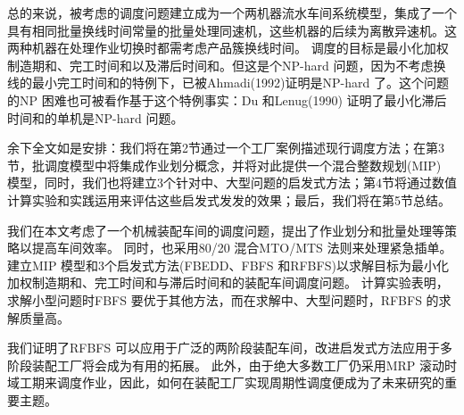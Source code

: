 总的来说，被考虑的调度问题建立成为一个两机器流水车间系统模型，集成了一个具有相同批量换线时间常量的批量处理同速机，这些机器的后续为离散异速机。这两种机器在处理作业切换时都需考虑产品簇换线时间。
调度的目标是最小化加权制造期和、完工时间和以及滞后时间和。但这是个NP-hard 问题，因为不考虑换线的最小完工时间和的特例下，已被Ahmadi(1992)证明是NP-hard 了。这个问题的NP 困难也可被看作基于这个特例事实：Du 和Lenug(1990) 证明了最小化滞后时间和的单机是NP-hard 问题。

余下全文如是安排：我们将在第2节通过一个工厂案例描述现行调度方法；在第3节，批调度模型中将集成作业划分概念，并将对此提供一个混合整数规划(MIP) 模型，同时，我们也将建立3个针对中、大型问题的启发式方法；第4节将通过数值计算实验和实践运用来评估这些启发式发发的效果；最后，我们将在第5节总结。







我们在本文考虑了一个机械装配车间的调度问题，提出了作业划分和批量处理等策略以提高车间效率。
同时，也采用80/20 混合MTO/MTS 法则来处理紧急插单。建立MIP 模型和3个启发式方法(FBEDD、FBFS 和RFBFS)以求解目标为最小化加权制造期和、完工时间和与滞后时间和的装配车间调度问题。
计算实验表明，求解小型问题时FBFS 要优于其他方法，而在求解中、大型问题时，RFBFS 的求解质量高。

我们证明了RFBFS 可以应用于广泛的两阶段装配车间，改进启发式方法应用于多阶段装配工厂将会成为有用的拓展。
此外，由于绝大多数工厂仍采用MRP 滚动时域工期来调度作业，因此，如何在装配工厂实现周期性调度便成为了未来研究的重要主题。
